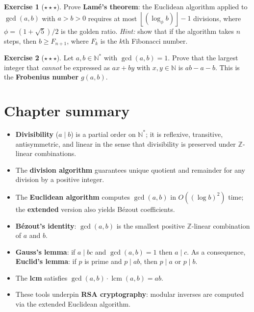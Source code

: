 \documentclass[12pt,a4paper,openany]{book}
\theoremstyle{definition}
\newtheorem{exercise}{Exercise}[chapter]
\theoremstyle{plain}
\theoremstyle{remark}
\newcommand{\N}{\mathbb{N}}
\newcommand{\Z}{\mathbb{Z}}
\newcommand{\floor}[1]{\left\lfloor #1 \right\rfloor}
\DeclareMathOperator{\lcm}{lcm}
\begin{document}
\begin{exercise}[$\star\star\star$]
\label{exer:ch1-lame}
Prove \textbf{Lam\'{e}'s theorem}: the Euclidean algorithm applied to
$\gcd(a,b)$ with $a > b > 0$ requires at most $\floor{(\log_\phi b)} - 1$
divisions, where $\phi = (1+\sqrt{5})/2$ is the golden ratio.
\textit{Hint:} show that if the algorithm takes $n$ steps, then $b \ge F_{n+1}$,
where $F_k$ is the $k$th Fibonacci number.
\end{exercise}

\begin{exercise}[$\star\star\star$]
\label{exer:ch1-chicken-mcnugget}
Let $a, b \in \N^{*}$ with $\gcd(a,b) = 1$. Prove that the largest integer
that \emph{cannot} be expressed as $ax + by$ with $x, y \in \N$ is $ab - a - b$.
This is the \textbf{Frobenius number} $g(a,b)$.
\end{exercise}

\section*{Chapter summary}

\begin{itemize}[nosep]
  \item \textbf{Divisibility} ($a \mid b$) is a partial order on $\N^{*}$;
        it is reflexive, transitive, antisymmetric, and linear in the sense
        that divisibility is preserved under $\Z$-linear combinations.
  \item The \textbf{division algorithm} guarantees unique quotient and remainder
        for any division by a positive integer.
  \item The \textbf{Euclidean algorithm} computes $\gcd(a,b)$ in $O((\log b)^2)$
        time; the \textbf{extended} version also yields B\'{e}zout coefficients.
  \item \textbf{B\'{e}zout's identity}: $\gcd(a,b)$ is the smallest positive
        $\Z$-linear combination of $a$ and $b$.
  \item \textbf{Gauss's lemma}: if $a \mid bc$ and $\gcd(a,b) = 1$ then $a \mid c$.
        As a consequence, \textbf{Euclid's lemma}: if $p$ is prime and $p \mid ab$,
        then $p \mid a$ or $p \mid b$.
  \item The \textbf{lcm} satisfies $\gcd(a,b) \cdot \lcm(a,b) = ab$.
  \item These tools underpin \textbf{RSA cryptography}: modular inverses
        are computed via the extended Euclidean algorithm.
\end{itemize}
\end{document}
